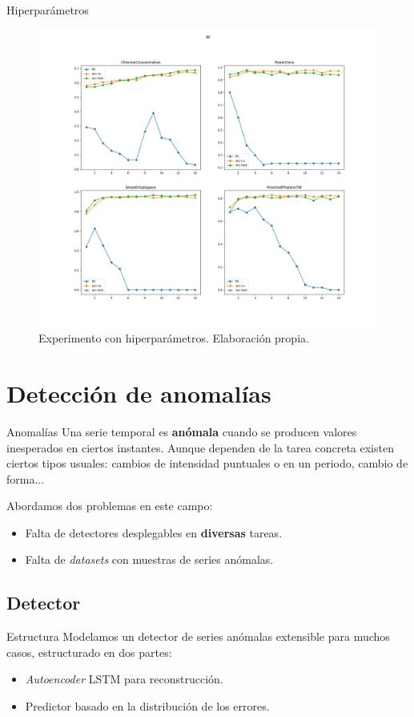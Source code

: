 \documentclass[spanish]{beamer}
\begin{document}
\begin{frame}{Hiperparámetros}
  \begin{figure}
    \centering
    \includegraphics[width=.78\textwidth]{img/hiper-RF}
    \caption{Experimento con hiperparámetros. Elaboración propia.}
  \end{figure}
\end{frame}

\section{Detección de anomalías}

\begin{frame}{Anomalías}
  Una serie temporal es \textbf{anómala} cuando se producen valores inesperados en ciertos instantes. \pause Aunque dependen de la tarea concreta existen ciertos tipos usuales: cambios de intensidad puntuales o en un periodo, cambio de forma...
  \pause

  Abordamos dos problemas en este campo:
  \begin{itemize}
    \item Falta de detectores desplegables en \textbf{diversas} tareas.
    \item Falta de \emph{datasets} con muestras de series anómalas.
  \end{itemize}
\end{frame}

\subsection{Detector}

\begin{frame}{Estructura}
  Modelamos un detector de series anómalas extensible para muchos casos, estructurado en dos partes:

  \begin{itemize}
    \item \emph{Autoencoder} LSTM para reconstrucción.
    \item Predictor basado en la distribución de los errores.
  \end{itemize}
\end{frame}
\end{document}
